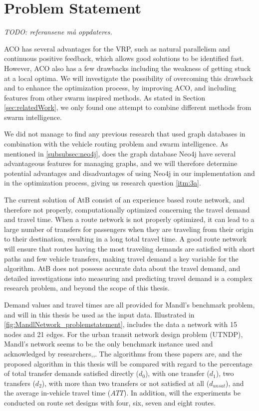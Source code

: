 \section{Problem Statement}
\label{sec:problemStatement}

\emph{\color{blue} TODO: referansene må oppdateres.}

ACO has several advantages for the VRP, such as natural parallelism and continuous positive feedback, which allows good solutions to be identified fast. However, ACO also has a few drawbacks including the weakness of getting stuck at a local optima. We will investigate the possibility of overcoming this drawback and to enhance the optimization process, by improving ACO, and including features from other swarm inspired methods. As stated in Section \vref{sec:relatedWork}, we only found one attempt to combine different methods from swarm intelligence.%

We did not manage to find any previous research that used graph databases in combination with the vehicle routing problem and swarm intelligence. As mentioned in \vref{subsubsec:neo4j}, does the graph database Neo4j \citep{website:neo4j} have several advantageous features for managing graphs, and we will therefore determine potential advantages and disadvantages of using Neo4j in our implementation and in the optimization process, giving us research question \vref{itm:3a}.

The current solution of AtB consist of an experience based route network, and therefore not properly, computationally optimized concerning the travel demand and travel time. When a route network is not properly optimized, it can lead to a large number of transfers for passengers when they are traveling from their origin to their destination, resulting in a long total travel time. A good route network will ensure that routes having the most traveling demands are satisfied with short paths and few vehicle transfers, making travel demand a key variable for the algorithm. AtB\citep{website:atb} does not possess accurate data about the travel demand, and detailed investigations into measuring and predicting travel demand is a complex research problem, and beyond the scope of this thesis. 

Demand values and travel times are all provided for Mandl's benchmark problem\citep{mandl79}, and will in this thesis be used as the input data. Illustrated in \vref{fig:MandlNetwork_problemstatement}, includes the data a network with 15 nodes and 21 edges. For the urban transit network design problem (UTNDP), Mandl's network seems to be the only benchmark instance used and acknowledged by researchers\citep{fan09},\citep{kechagiopoulos14},\citep{nikolic14}. The algorithms from these papers are, and the proposed algorithm in this thesis will be compared with regard to the percentage of total transfer demands satisfied directly ($d_0$), with one transfer ($d_1$), two transfers ($d_2$), with more than two transfers or not satisfied at all ($d_{unsat}$), and the average in-vehicle travel time ($ATT$). In addition, will the experiments be conducted on route set designs with four, six, seven and eight routes. 

